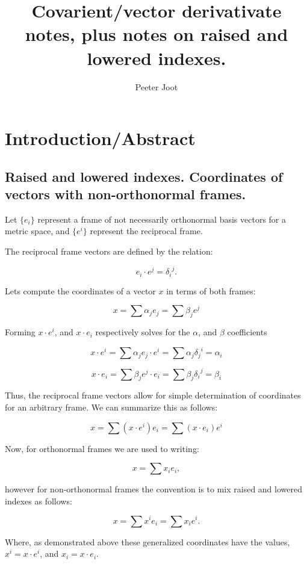 \documentclass{article}      %
\title{ Covarient/vector derivativate notes, plus notes on raised and lowered indexes.  }
\author{Peeter Joot}         %
\begin{document}

\maketitle{}

\section{Introduction/Abstract}

\subsection{ Raised and lowered indexes. Coordinates of vectors with non-orthonormal frames. }

Let $\{ e_i \}$ represent a frame of not necessarily orthonormal basis vectors for a metric space, and $\{ e^i \}$ represent the reciprocal frame.

The reciprocal frame vectors are defined by the relation:

\begin{equation}
e_i \cdot e^j = {\delta_i}^j.
\end{equation}

Lets compute the coordinates of a vector $x$ in terms of both frames:

\[
x = \sum \alpha_j e_j = \sum \beta_j e^j
\]

Forming $x \cdot e^i$, and $x \cdot e_i$ respectively solves for the $\alpha$, and $\beta$ coefficients

\[
x \cdot e^i = \sum \alpha_j e_j \cdot e^i = \sum \alpha_j {\delta_j}^i = \alpha_i
\]

\[
x \cdot e_i = \sum \beta_j e^j \cdot e_i = \sum \beta_j {\delta_i}^j = \beta_i
\]

Thus, the reciprocal frame vectors allow for simple determination of coordinates for an arbitrary frame. We can summarize this as follows:

\[
x = \sum ( x \cdot e^i ) e_i = \sum ( x \cdot e_i ) e^i
\]

Now, for orthonormal frames we are used to writing:

\[
x = \sum x_i e_i,
\]

however for non-orthonormal frames the convention is to mix raised and lowered indexes as follows:

\[
x = \sum x^i e_i = \sum x_i e^i.
\]

Where, as demonstrated above these generalized coordinates have the values, $x^i = x \cdot e^i$, and $x_i = x \cdot e_i$.
\end{document}
